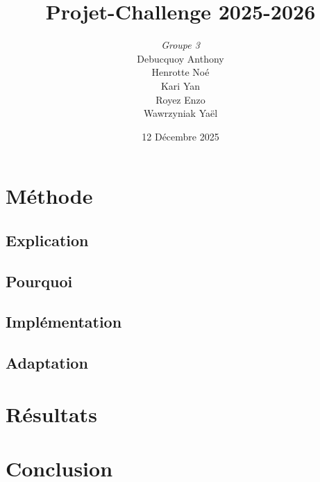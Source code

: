 \documentclass[aspectratio=169]{beamer}
\title{Projet-Challenge 2025-2026}
\author{
	\emph{Groupe 3} \texorpdfstring{\\}{}
	Debucquoy Anthony \texorpdfstring{\\}{\&}
	Henrotte Noé \texorpdfstring{\\}{\&}
	Kari Yan \texorpdfstring{\\}{\&}
	Royez Enzo \texorpdfstring{\\}{\&}
	Wawrzyniak Yaël \texorpdfstring{\\}{\&}
}
\institute{UMons - Graph\&Opti}
\date{12 Décembre 2025}
\begin{document}
\frame{\titlepage}

\frame{\tableofcontents}

\section{Méthode}

\begin{frame}{\insertsectionhead}
	
\end{frame}

\subsection{Explication}
\begin{frame}{\insertsectionhead}{\insertsubsectionhead}
	
\end{frame}

\subsection{Pourquoi}
\begin{frame}{\insertsectionhead}{\insertsubsectionhead}
	
\end{frame}

\subsection{Implémentation}
\begin{frame}{\insertsectionhead}{\insertsubsectionhead}
	
\end{frame}

\subsection{Adaptation}
\begin{frame}{\insertsectionhead}{\insertsubsectionhead}
	
\end{frame}

\section{Résultats}
\begin{frame}{\insertsectionhead}
	
\end{frame}

\section{Conclusion}
\begin{frame}{\insertsectionhead}
	
\end{frame}
\end{document}
